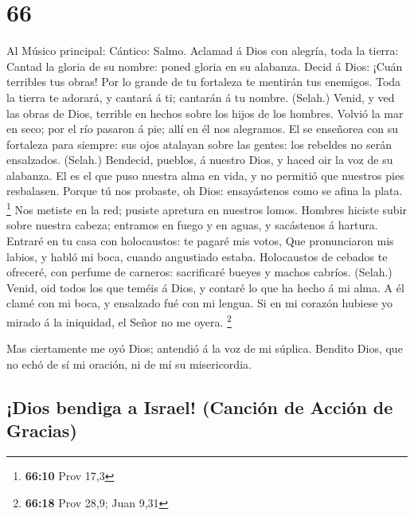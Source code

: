 \hypertarget{section-65}{%
\section{66}\label{section-65}}

 Al Músico principal: Cántico: Salmo. Aclamad á Dios con
alegría, toda la tierra:  Cantad la gloria de su nombre:
poned gloria en su alabanza.  Decid á Dios: ¡Cuán terribles
tus obras! Por lo grande de tu fortaleza te mentirán tus enemigos.
 Toda la tierra te adorará, y cantará á ti; cantarán á tu
nombre. (Selah.)  Venid, y ved las obras de Dios, terrible
en hechos sobre los hijos de los hombres.  Volvió la mar en
seco; por el río pasaron á pie; allí en él nos alegramos. 
El se enseñorea con su fortaleza para siempre: sus ojos atalayan sobre
las gentes: los rebeldes no serán ensalzados. (Selah.) 
Bendecid, pueblos, á nuestro Dios, y haced oir la voz de su alabanza.
 El es el que puso nuestra alma en vida, y no permitió que
nuestros pies resbalasen.  Porque tú nos probaste, oh Dios:
ensayástenos como se afina la plata. \footnote{\textbf{66:10} Prov 17,3}
 Nos metiste en la red; pusiste apretura en nuestros lomos.
 Hombres hiciste subir sobre nuestra cabeza; entramos en
fuego y en aguas, y sacástenos á hartura.  Entraré en tu
casa con holocaustos: te pagaré mis votos,  Que
pronunciaron mis labios, y habló mi boca, cuando angustiado estaba.
 Holocaustos de cebados te ofreceré, con perfume de
carneros: sacrificaré bueyes y machos cabríos. (Selah.) 
Venid, oid todos los que teméis á Dios, y contaré lo que ha hecho á mi
alma.  A él clamé con mi boca, y ensalzado fué con mi
lengua.  Si en mi corazón hubiese yo mirado á la iniquidad,
el Señor no me oyera. \footnote{\textbf{66:18} Prov 28,9; Juan 9,31}

 Mas ciertamente me oyó Dios; antendió á la voz de mi
súplica.  Bendito Dios, que no echó de sí mi oración, ni de
mí su misericordia.

\hypertarget{dios-bendiga-a-israel-canciuxf3n-de-acciuxf3n-de-gracias}{%
\subsection{¡Dios bendiga a Israel! (Canción de Acción de
Gracias)}\label{dios-bendiga-a-israel-canciuxf3n-de-acciuxf3n-de-gracias}}

